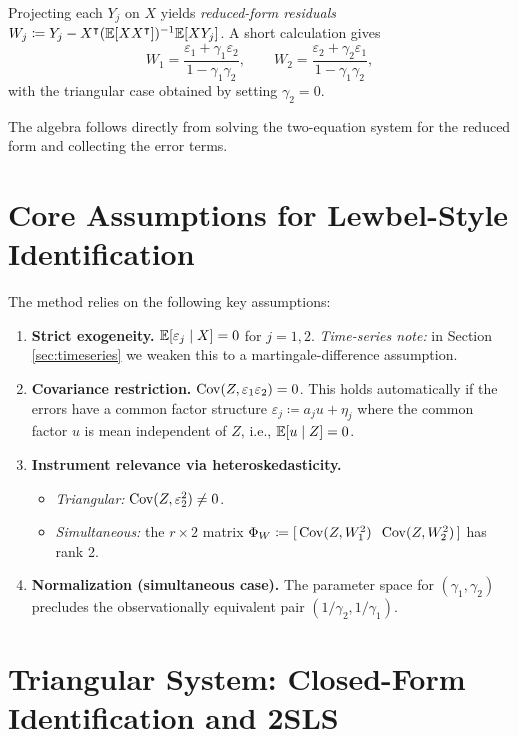 Projecting each $Y_{j}$ on $X$ yields \emph{reduced-form residuals}
$W_{j}\coloneqq Y_{j}-X^{\intercal}(\mathbb{E}[XX^{\intercal}])^{-1}\mathbb{E}[XY_{j}]$. A short calculation
gives
\[
W_{1}=\frac{\varepsilon_{1}+\gamma_{1}\varepsilon_{2}}{1-\gamma_{1}\gamma_{2}},\qquad W_{2}=\frac{\varepsilon_{2}+\gamma_{2}\varepsilon_{1}}{1-\gamma_{1}\gamma_{2}},
\]
with the triangular case obtained by setting $\gamma_{2}=0$.

\begin{remark} The algebra follows directly from solving the two-equation
system for the reduced form and collecting the error terms. \end{remark}

\section{Core Assumptions for Lewbel-Style Identification}

The method relies on the following key assumptions:

\begin{enumerate}[label=(LW\arabic*), ref=(LW\arabic*)]
\item \label{enu:exogeneity}\textbf{Strict exogeneity.} $\mathbb{E}[\varepsilon_{j}\mid X]=0$
for $j=1,2$. \emph{Time-series note:} in Section \ref{sec:timeseries}
we weaken this to a martingale-difference assumption.
\item \label{enu:error_covariance}\textbf{Covariance restriction.} $\operatorname{Cov}(Z,\varepsilon_{1}\varepsilon_{2})=0$.
This holds automatically if the errors have a common factor structure
$\varepsilon_{j}\coloneqq a_{j}u+\eta_{j}$ where the common factor
$u$ is mean independent of $Z$, i.e., $\mathbb{E}[u\mid Z]=0$.
\item \label{enu:het}\textbf{Instrument relevance via heteroskedasticity.}
\begin{itemize}
\itemsep2pt
\item \emph{Triangular:} $\operatorname{Cov}(Z,\varepsilon_{2}^{2})\neq0$.
\item \emph{Simultaneous:} the $r\times2$ matrix $\Phi_{W}\coloneqq[\,\operatorname{Cov}(Z,W_{1}^{2})\;\;\operatorname{Cov}(Z,W_{2}^{2})\,]$
has rank 2.
\end{itemize}
\item \textbf{\label{enu:norm}Normalization (simultaneous case).} The parameter
space for $(\gamma_{1},\gamma_{2})$ precludes the observationally
equivalent pair $(1/\gamma_{2},1/\gamma_{1})$.
\end{enumerate}

\section{Triangular System: Closed-Form Identification and 2SLS}

